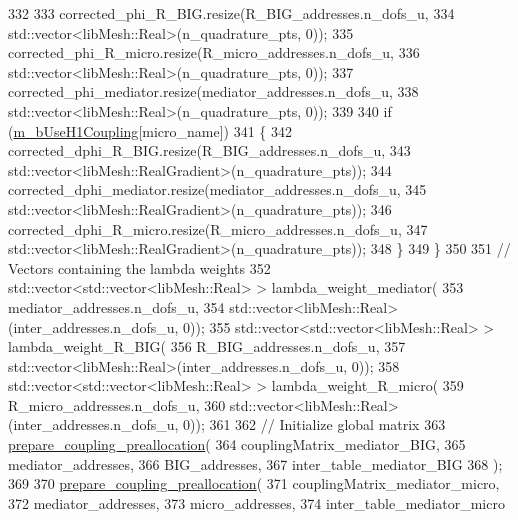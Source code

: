 \begin{DoxyCode}
332 
333             corrected\_phi\_R\_BIG.resize(R\_BIG\_addresses.n\_dofs\_u,
334                     std::vector<libMesh::Real>(n\_quadrature\_pts, 0));
335             corrected\_phi\_R\_micro.resize(R\_micro\_addresses.n\_dofs\_u,
336                     std::vector<libMesh::Real>(n\_quadrature\_pts, 0));
337             corrected\_phi\_mediator.resize(mediator\_addresses.n\_dofs\_u,
338                     std::vector<libMesh::Real>(n\_quadrature\_pts, 0));
339 
340             \textcolor{keywordflow}{if} (\hyperlink{classcarl_1_1assemble__coupling__matrices_a9e3bf058bd10aacb63ebbab34fe37628}{m\_bUseH1Coupling}[micro\_name])
341             \{
342                 corrected\_dphi\_R\_BIG.resize(R\_BIG\_addresses.n\_dofs\_u,
343                         std::vector<libMesh::RealGradient>(n\_quadrature\_pts));
344                 corrected\_dphi\_mediator.resize(mediator\_addresses.n\_dofs\_u,
345                         std::vector<libMesh::RealGradient>(n\_quadrature\_pts));
346                 corrected\_dphi\_R\_micro.resize(R\_micro\_addresses.n\_dofs\_u,
347                         std::vector<libMesh::RealGradient>(n\_quadrature\_pts));
348             \}
349         \}
350 
351         \textcolor{comment}{// Vectors containing the lambda weights}
352         std::vector<std::vector<libMesh::Real> > lambda\_weight\_mediator(
353                 mediator\_addresses.n\_dofs\_u,
354                 std::vector<libMesh::Real>(inter\_addresses.n\_dofs\_u, 0));
355         std::vector<std::vector<libMesh::Real> > lambda\_weight\_R\_BIG(
356                 R\_BIG\_addresses.n\_dofs\_u,
357                 std::vector<libMesh::Real>(inter\_addresses.n\_dofs\_u, 0));
358         std::vector<std::vector<libMesh::Real> > lambda\_weight\_R\_micro(
359                 R\_micro\_addresses.n\_dofs\_u,
360                 std::vector<libMesh::Real>(inter\_addresses.n\_dofs\_u, 0));
361     
362         \textcolor{comment}{// Initialize global matrix}
363         \hyperlink{classcarl_1_1assemble__coupling__matrices_ace985578e3743b194f9058431735d997}{prepare\_coupling\_preallocation}(
364                 couplingMatrix\_mediator\_BIG,
365                 mediator\_addresses,
366                 BIG\_addresses,
367                 inter\_table\_mediator\_BIG
368                 );
369 
370         \hyperlink{classcarl_1_1assemble__coupling__matrices_ace985578e3743b194f9058431735d997}{prepare\_coupling\_preallocation}(
371                 couplingMatrix\_mediator\_micro,
372                 mediator\_addresses,
373                 micro\_addresses,
374                 inter\_table\_mediator\_micro

\end{DoxyCode}
